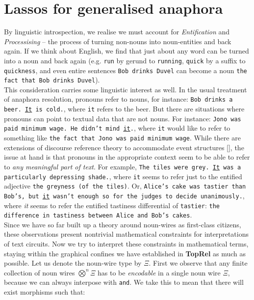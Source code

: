 \section{Lassos for generalised anaphora}

 By linguistic introspection, we realise we must account for \emph{Entification} and \emph{Processising} -- the process of turning non-nouns into noun-entities and back again. If we think about English, we find that just about any word can be turned into a noun and back again (e.g. \texttt{run} by gerund to \texttt{running}, \texttt{quick} by a suffix to \texttt{quickness}, and even entire sentences \texttt{Bob drinks Duvel} can become a noun \texttt{the fact that Bob drinks Duvel}).\\

This consideration carries some linguistic interest as well. In the usual treatment of anaphora resolution, pronouns refer to nouns, for instance: \texttt{Bob drinks a beer. \underline{It} is cold.}, where \texttt{it} refers to the beer. But there are situations where pronouns can point to textual data that are not nouns. For instance: \texttt{Jono was paid minimum wage. He didn't mind \underline{it}.}, where \texttt{it} would like to refer to something like \texttt{the fact that Jono was paid minimum wage}. While there are extensions of discourse reference theory to accommodate event structures [], the issue at hand is that pronouns in the appropriate context seem to be able to refer to \emph{any meaningful part of text}. For example, \texttt{The tiles were grey. \underline{It} was a particularly depressing shade.}, where \texttt{it} seems to refer just to the entified adjective \texttt{the greyness (of the tiles)}. Or, \texttt{Alice's cake was tastier than Bob's, but \underline{it} wasn't enough so for the judges to decide unanimously.}, where \emph{it} seems to refer the entified tastiness differential of \texttt{tastier}: \texttt{the difference in tastiness between Alice and Bob's cakes}.\\

Since we have so far built up a theory around noun-wires as first-class citizens, these observations present nontrivial mathematical constraints for interpretations of text circuits. Now we try to interpret these constraints in mathematical terms, staying within the graphical confines we have established in \textbf{TopRel} as much as possible. Let us denote the noun-wire type by $\Xi$. First we observe that any finite collection of noun wires $\bigotimes^n \Xi$ has to be \emph{encodable} in a single noun wire $\Xi$, because we can always interpose with \texttt{and}. We take this to mean that there will exist morphisms such that:

